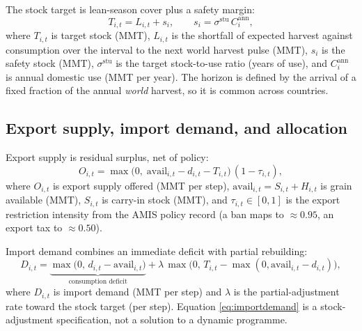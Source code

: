 The stock target is lean-season cover plus a safety margin:
\begin{equation}
T_{i,t}=L_{i,t}+s_i,
\qquad
s_i=\sigma^{\mathrm{stu}}\,C^{\mathrm{ann}}_i,
\label{eq:target}
\end{equation}
where \(T_{i,t}\) is target stock (MMT), \(L_{i,t}\) is the shortfall of
expected harvest against consumption over the interval to the next world
harvest pulse (MMT), \(s_i\) is the safety stock (MMT),
\(\sigma^{\mathrm{stu}}\) is the target stock-to-use ratio (years of use),
and \(C^{\mathrm{ann}}_i\) is annual domestic use (MMT per year). The
horizon is defined by the arrival of a fixed fraction of the annual
\emph{world} harvest, so it is common across countries.

\subsection{Export supply, import demand, and allocation}

Export supply is residual surplus, net of policy:
\begin{equation}
O_{i,t}=\max\bigl(0,\;\mathrm{avail}_{i,t}-d_{i,t}-T_{i,t}\bigr)\,(1-\tau_{i,t}),
\label{eq:offers}
\end{equation}
where \(O_{i,t}\) is export supply offered (MMT per step),
\(\mathrm{avail}_{i,t}=S_{i,t}+H_{i,t}\) is grain available (MMT),
\(S_{i,t}\) is carry-in stock (MMT), and \(\tau_{i,t}\in[0,1]\) is the
export restriction intensity from the AMIS policy record (a ban maps to
\(\approx 0.95\), an export tax to \(\approx 0.50\)).

Import demand combines an immediate deficit with partial rebuilding:
\begin{equation}
D_{i,t}=\underbrace{\max\bigl(0,\,d_{i,t}-\mathrm{avail}_{i,t}\bigr)}_{\text{consumption deficit}}
+\lambda\,\max\bigl(0,\,T_{i,t}-\max(0,\mathrm{avail}_{i,t}-d_{i,t})\bigr),
\label{eq:importdemand}
\end{equation}
where \(D_{i,t}\) is import demand (MMT per step) and \(\lambda\) is the
partial-adjustment rate toward the stock target (per step). Equation
\eqref{eq:importdemand} is a stock-adjustment specification, not a
solution to a dynamic programme.

